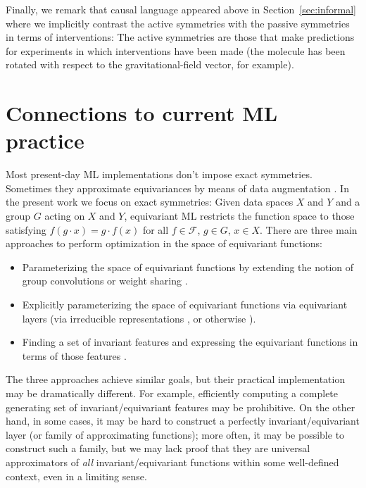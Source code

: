\documentclass[]{article} %
\renewcommand{\mathcal}[1]{\mathscr{#1}} %
\newcommand{\sectionname}{Section}
\newcommand{\secref}[1]{\sectionname~\ref{#1}}
\begin{document}
Finally, we remark that causal language appeared above in \secref{sec:informal} where we implicitly contrast the active symmetries with the passive symmetries in terms of interventions:
The active symmetries are those that make predictions for experiments in which interventions have been made (the molecule has been rotated with respect to the gravitational-field vector, for example).

\section{Connections to current ML practice}\label{sec:practice}
Most present-day ML implementations don't impose exact symmetries. Sometimes they approximate equivariances by means of data augmentation \citep{chen2020group, huang2022quantifying}.
In the present work we focus on exact symmetries: Given data spaces $X$ and $Y$ and a group $G$ acting on $X$ and $Y$, equivariant ML restricts the function space to those satisfying  $f(g\cdot x) = g \cdot f(x)$ for all $f\in \mathcal F$, $g\in G$, $x\in X$.
There are three main approaches to perform optimization in the space of equivariant functions:
\begin{itemize}
    \item Parameterizing the space of equivariant functions by extending the notion of group convolutions or weight sharing \cite{kondor2018convolution, cohen2016group}.
    \item Explicitly parameterizing the space of equivariant functions via equivariant layers (via irreducible representations \citep{thomas2018tensor, geiger2022e3nn, kondor2018n}, or otherwise \cite{finzi2020generalizing, finzi2021practical}).
    \item Finding a set of invariant features and expressing the equivariant functions in terms of those features \citep{villar2021scalars,blum2022equivariant}.
\end{itemize}
The three approaches achieve similar goals, but their practical implementation may be dramatically different. For example, efficiently computing a complete generating set of invariant/equivariant features may be prohibitive. On the other hand, in some cases, it may be hard to construct a perfectly invariant/equivariant layer (or family of approximating functions); more often, it may be possible to construct such a family, but we may lack proof that they are universal approximators of \textit{all} invariant/equivariant functions within some well-defined context, even in a limiting sense.
\end{document}
